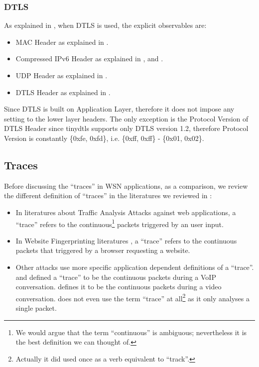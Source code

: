 \subsubsection{DTLS}

As explained in , when DTLS is used, the explicit observables are: 

\begin{itemize}
	\item MAC Header as explained in .
	
	\item Compressed IPv6 Header as explained in ,  and .
	
	\item UDP Header as explained in .
	
	\item DTLS Header as explained in .
\end{itemize}

Since DTLS is built on Application Layer, therefore it does not impose any setting to the lower layer headers. The only exception is the Protocol Version of DTLS Header since tinydtls supports only DTLS version 1.2, therefore Protocol Version is constantly \{0xfe, 0xfd\}, i.e. \{0xff, 0xff\} - \{0x01, 0x02\}.

\subsection{Traces}

Before discussing the ``traces'' in WSN applications, as a comparison, we review the different definition of ``traces'' in the literatures we reviewed in :

\begin{itemize}
	\item In literatures about Traffic Analysis Attacks against web applications\cite{WebSideChannel}\cite{PinpointWeb}\cite{SearchAttack}, a ``trace'' refers to the continuous\footnote{We would argue that the term ``continuous'' is ambiguous; nevertheless it is the best definition we can thought of.} packets triggered by an user input.
	\item In Website Fingerprinting literatures\cite{WebsiteFingerprint} \cite{HClassifier} \cite{PClassifier} \cite{Peekaboo}, a ``trace'' refers to the continuous packets that triggered by a browser requesting a website.
	\item Other attacks use more specific application dependent definitions of a ``trace''. \cite{VoIPLanguage} and \cite{VoIPPhrases} defined a ``trace'' to be the continuous packets during a VoIP conversation. \cite{Video} defines it to be the continuous packets during a video conversation. \cite{AppleMessage} does not even use the term ``trace'' at all\footnote{Actually it did used once as a verb equivalent to ``track''.} as it only analyses a single packet.
\end{itemize}


